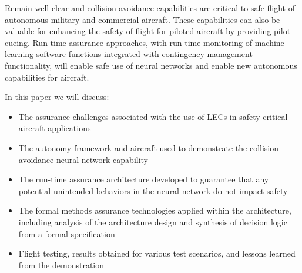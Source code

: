 Remain-well-clear and collision avoidance capabilities are critical to safe flight of autonomous
military and commercial aircraft. These capabilities can also be valuable for
enhancing the safety of flight for piloted aircraft by providing pilot cueing. Run-time assurance
approaches, with run-time monitoring of machine learning software functions integrated with
contingency management functionality, will enable safe use of neural networks and enable new
autonomous capabilities for aircraft.

In this paper we will discuss: 
\begin{itemize} 
\item The assurance challenges associated with the use of LECs in safety-critical aircraft applications 
\item The autonomy framework and aircraft used to demonstrate the collision avoidance neural network capability 
\item The run-time assurance architecture developed to guarantee that any potential unintended behaviors in the neural network do not impact safety
\item The formal methods assurance technologies applied within the architecture, including analysis of the architecture design and synthesis of decision logic from a formal specification
\item Flight testing, results obtained for various test scenarios, and lessons learned from the
demonstration
\end{itemize}
